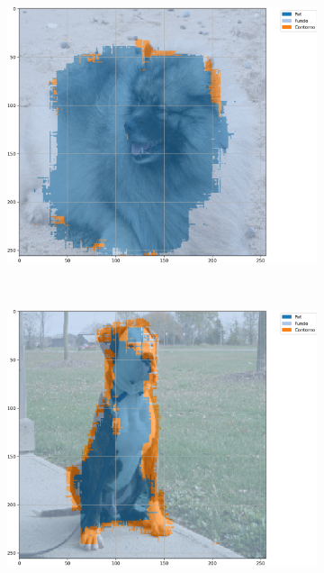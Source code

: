 \begin{figure}[H]
    \centering
    \caption[Segmentação com U-Net-\textit{Like}, \textit{Max Pooling}, 20 épocas, \textit{Oxford-IIIT Pets}, mIoU.]{Exemplos segmentados a partir de U-Net-\textit{Like} com \textit{Max Pooling} e 20 épocas no conjunto de dados \textit{Oxford-IIIT Pets} baseada em mIoU.}
    \label{results:fig:semantic:13}
     \begin{subfigure}[t]{0.32\textwidth}
         \centering
         \includegraphics[width=1\linewidth]{recursos/imagens/results/max_miou_unetlike500_image_0_overlayed_segmentation.png}
         \label{results:fig:semantic:13.1}
     \end{subfigure}%
     ~ 
     \begin{subfigure}[t]{0.32\textwidth}
         \centering
         \includegraphics[width=1\linewidth]{recursos/imagens/results/max_miou_unetlike500_image_1_overlayed_segmentation.png}

\end{subfigure}
\end{figure}
